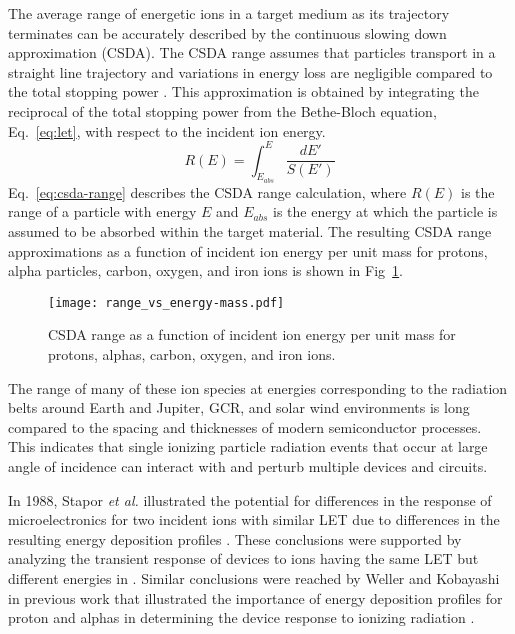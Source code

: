 The average range of energetic ions in a target medium as its trajectory terminates can be accurately described by the continuous slowing down approximation (CSDA). 
The CSDA range assumes that particles transport in a straight line trajectory and variations in energy loss are negligible compared to the total stopping power \cite{bichsel1988straggling}.
This approximation is obtained by integrating the reciprocal of the total stopping power from the Bethe-Bloch equation, Eq.~\ref{eq:let}, with respect to the incident ion energy.
\begin{equation}
    \label{eq:csda-range}
    R(E) = \int_{E_{abs}}^E \frac{dE'}{S(E')}
\end{equation}
Eq.~\ref{eq:csda-range} describes the CSDA range calculation, where $R(E)$ is the range of a particle with energy $E$ and $E_{abs}$ is the energy at which the particle is assumed to be absorbed within the target material.
The resulting CSDA range approximations as a function of incident ion energy per unit mass for protons, alpha particles, carbon, oxygen, and iron ions is shown in Fig~\ref{fig:range-vs-energy-per-mass}.
\begin{figure}[htbp]
    \begin{center}
        \texttt{[image: range\_vs\_energy-mass.pdf]}
    \end{center}
    \caption{CSDA range as a function of incident ion energy per unit mass for protons, alphas, carbon, oxygen, and iron ions.}
    \label{fig:range-vs-energy-per-mass}
\end{figure}

The range of many of these ion species at energies corresponding to the radiation belts around Earth and Jupiter, GCR, and solar wind environments is long compared to the spacing and thicknesses of modern semiconductor processes.
This indicates that single ionizing particle radiation events that occur at large angle of incidence can interact with and perturb multiple devices and circuits.

In 1988, Stapor \emph{et al.} illustrated the potential for differences in the response of microelectronics for two incident ions with similar LET due to differences in the resulting energy deposition profiles \cite{Stapor:1988ws}. 
These conclusions were supported by analyzing the transient response of devices to ions having the same LET but different energies in \cite{HowardJr:2002vg}.
Similar conclusions were reached by Weller and Kobayashi in previous work that illustrated the importance of energy deposition profiles for proton and alphas in determining the device response to ionizing radiation \cite{Weller:2003je, Kobayashi:2004dg}.

